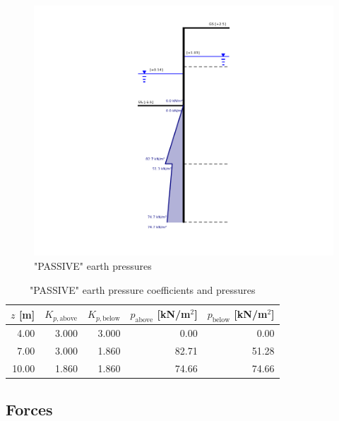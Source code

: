 \begin{figure}[H]
    \centering
    \includegraphics[width=0.75\linewidth]{figures/appendix-i/passive_earth_pressure.png}
    \caption{"PASSIVE" earth pressures}
    \label{fig:appendix_passive_earth_pressure}
\end{figure}

\begin{table}[H]
  \centering
  \caption{"PASSIVE" earth pressure coefficients and pressures}
  \label{tab:appendix_passive_pressures_coeffiecients}
  \small
  \setlength{\tabcolsep}{8pt}
  \renewcommand{\arraystretch}{1.15}
  \begin{tabular}{@{}r r r r r@{}}
    \toprule
    $z$ [m] &
    $K_{p,\text{above}}$ &
    $K_{p,\text{below}}$ &
    $p_{\text{above}}$ [kN/m$^2$] &
    $p_{\text{below}}$ [kN/m$^2$] \\
    \midrule
     4.00 & 3.000 & 3.000 &  0.00 &  0.00 \\
     7.00 & 3.000 & 1.860 & 82.71 & 51.28 \\
    10.00 & 1.860 & 1.860 & 74.66 & 74.66 \\
    \bottomrule
  \end{tabular}
\end{table}

\subsection{Forces}

